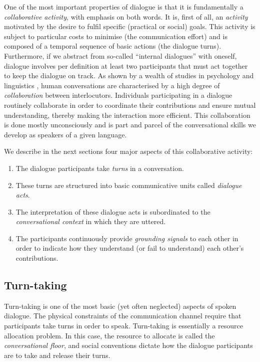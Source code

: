 One of the most important properties of dialogue is that it is fundamentally a \textit{collaborative activity}, with emphasis on both words.  It is, first of all, an \textit{activity} motivated by the desire to fulfil specific (practical or social) goals.  This activity is subject to particular costs to minimise (the communication effort) and is composed of a temporal sequence of basic actions (the dialogue turns).  Furthermore, if we abstract from so-called ``internal dialogues'' with oneself, dialogue involves per definition at least two participants that must act together to keep the dialogue on track.  As shown by a wealth of studies in psychology and linguistics \citep{Clark1989,Allwood92,Clark96,Garrod2004,Tomasello2005}, human conversations are characterised by a high degree of \textit{collaboration} between interlocutors.  Individuals participating in a dialogue routinely collaborate in order to coordinate their contributions and ensure mutual understanding, thereby making the interaction more efficient. This collaboration is done mostly unconsciously and is part and parcel of the conversational skills we develop as speakers of a given language. 

We describe in the next sections four major aspects of this collaborative activity: \begin{enumerate}
\item The dialogue participants take \textit{turns} in a conversation.
\item These turns are structured into basic communicative units called \textit{dialogue acts}.
\item The interpretation of these dialogue acts is subordinated to the \textit{conversational context} in which they are uttered. 
\item The participants continuously provide \textit{grounding signals} to each other in order to indicate how they understand (or fail to understand) each other's contributions.
\end{enumerate}

\subsection{Turn-taking}

Turn-taking is one of the most basic (yet often neglected) aspects of spoken dialogue. The physical constraints of the communication channel require that participants take turns in order to speak.   Turn-taking is essentially a resource allocation problem.  In this case, the resource to allocate is called the \textit{conversational floor}, and social conventions dictate how the dialogue participants are to take and release their turns. 

